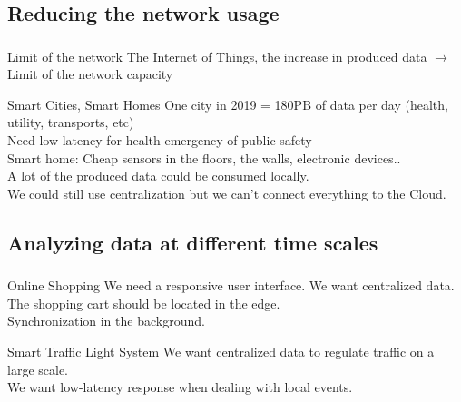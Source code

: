 \documentclass[utf8,xcolor=table, page number]{earlywinter}
\begin{document}
\subsection{Reducing the network usage}
\begin{frame}
  \frametitle{\secname}
  \framesubtitle{\subsecname}

  \begin{alertblock}{Limit of the network}
    The Internet of Things, the increase in produced data $\to$ Limit of the network capacity
  \end{alertblock}
  \vfill
  \begin{exampleblock}{Smart Cities, Smart Homes}
    One city in 2019 = 180PB of data per day (health, utility, transports, etc)\\
    Need low latency for health emergency of public safety \\
    Smart home: Cheap sensors in the floors, the walls, electronic devices..\\
    A lot of the produced data could be consumed locally.\\
    We could still use centralization but we can't connect everything to the Cloud.
  \end{exampleblock}
  
\end{frame}


\subsection{Analyzing data at different time scales}
\begin{frame}
  \frametitle{\secname}
  \framesubtitle{\subsecname}

  \begin{exampleblock}{Online Shopping}
    We need a responsive user interface. We want centralized data.\\
    The shopping cart should be located in the edge.\\
    Synchronization in the background.
  \end{exampleblock}
  \vfill
  \begin{exampleblock}{Smart Traffic Light System}
    We want centralized data to regulate traffic on a large scale.\\
    We want low-latency response when dealing with local events.

  \end{exampleblock}
  
%  
\end{frame}
\end{document}
